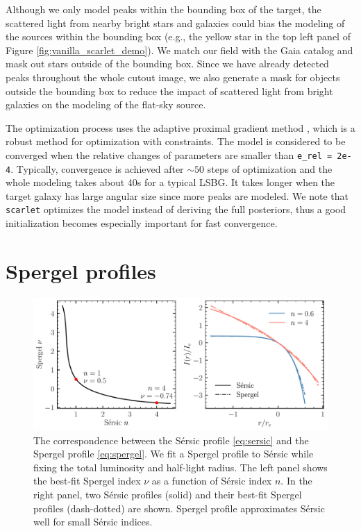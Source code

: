 \documentclass[twocolumn,astrosymb,twocolappendix]{aastex631}
\newcommand{\code}[1]{\texttt{#1}}
\newcommand{\sersic}{S\'ersic}
\begin{document}
\begin{CJK*}{UTF8}{gbsn}
Although we only model peaks within the bounding box of the target, the scattered light from nearby bright stars and galaxies could bias the modeling of the sources within the bounding box (e.g., the yellow star in the top left panel of Figure \ref{fig:vanilla_scarlet_demo}). We match our field with the Gaia catalog \citep{GAIA2016,GAIA2018} and mask out stars outside of the bounding box. Since we have already detected peaks throughout the whole cutout image, we also generate a mask for objects outside the bounding box to reduce the impact of scattered light from bright galaxies on the modeling of the flat-sky source. 

The optimization process uses the adaptive proximal gradient method \citep{Melchior2019}, which is a robust method for optimization with constraints. The model is considered to be converged when the relative changes of parameters are smaller than \code{e\_rel\,=\,2e-4}. Typically, convergence is achieved after $\sim 50$ steps of optimization and the whole modeling takes about 40s for a typical LSBG. It takes longer when the target galaxy has large angular size since more peaks are modeled. We note that \code{scarlet} optimizes the model instead of deriving the full posteriors, thus a good initialization becomes especially important for fast convergence. 


\section{Spergel profiles}\label{ap:spergel}
\begin{figure}[htbp!]
	\vbox{ 
		\centering
		\includegraphics[width=0.75\linewidth]{spergel_sersic_calib.pdf}
	}
    \caption{The correspondence between the \sersic{} profile \eqref{eq:sersic} and the Spergel profile \eqref{eq:spergel}. We fit a Spergel profile to \sersic{} while fixing the total luminosity and half-light radius. The left panel shows the best-fit Spergel index $\nu$ as a function of \sersic{} index $n$. In the right panel, two \sersic{} profiles (solid) and their best-fit Spergel profiles (dash-dotted) are shown. Spergel profile approximates \sersic{} well for small \sersic{} indices.  
    }
    \label{fig:spgl_calib}
\end{figure}


\end{CJK*}
\end{document}
